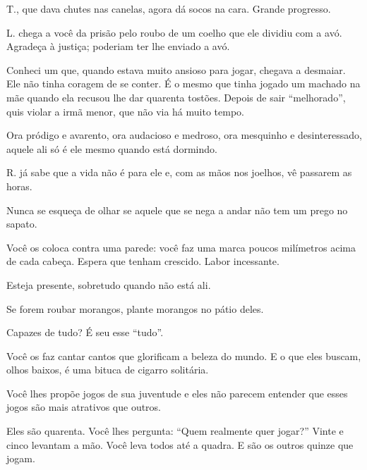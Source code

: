 T., que dava chutes nas canelas, agora dá socos na cara. Grande
progresso.

\bigskip
\bigskip

L. chega a você da prisão pelo roubo de um coelho que ele dividiu com a
avó. Agradeça à justiça; poderiam ter lhe enviado a avó.

\bigskip
\bigskip

Conheci um que, quando estava muito ansioso para jogar, chegava a
desmaiar. Ele não tinha coragem de se conter. É o mesmo que tinha jogado
um machado na mãe quando ela recusou lhe dar quarenta tostões. Depois de
sair ``melhorado'', quis violar a irmã menor, que não via há muito
tempo.

\bigskip
\bigskip

Ora pródigo e avarento, ora audacioso e medroso, ora mesquinho e
desinteressado, aquele ali só é ele mesmo quando está dormindo.

\bigskip
\bigskip

R. já sabe que a vida não é para ele e, com as mãos nos joelhos, vê
passarem as horas.

\bigskip
\bigskip

Nunca se esqueça de olhar se aquele que se nega a andar não tem um prego
no sapato.

\bigskip
\bigskip

Você os coloca contra uma parede: você faz uma marca poucos milímetros
acima de cada cabeça. Espera que tenham crescido. Labor incessante.

\bigskip
\bigskip

Esteja presente, sobretudo quando não está ali.

\bigskip
\bigskip

Se forem roubar morangos, plante morangos no pátio deles.

\bigskip
\bigskip

Capazes de tudo? É seu esse ``tudo''.

\bigskip
\bigskip

Você os faz cantar cantos que glorificam a beleza do mundo. E o que eles
buscam, olhos baixos, é uma bituca de cigarro solitária.

\bigskip
\bigskip

Você lhes propõe jogos de sua juventude e eles não parecem entender que
esses jogos são mais atrativos que outros.

\bigskip
\bigskip

Eles são quarenta. Você lhes pergunta: ``Quem realmente quer jogar?''
Vinte e cinco levantam a mão.
Você leva todos até a quadra. E são os
outros quinze que jogam.

